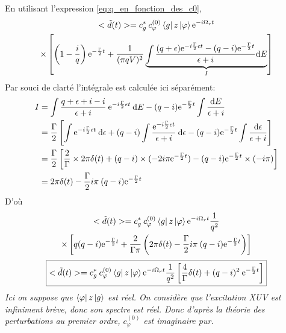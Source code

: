 En utilisant l'expression \ref{eq:q_en_fonction_des_c0},
\begin{multline}
<\tilde{d}(t)> = c_g^{*} \: c_{\varphi}^{(0)} \bra{g}  z \ket{\varphi} \mathrm{e}^{-i \Omega_r t} \\ \times \left[ \left( 1-\frac{i}{q} \right) \mathrm{e}^{-\frac{\Gamma}{2} t} + \frac{1}{(\pi q V)^2} \underbrace{\int \frac{(q+\epsilon ) \mathrm{e}^{- i \frac{\Gamma}{2} \epsilon t } - (q - i) \mathrm{e}^{-\frac{\Gamma}{2}t}}{\epsilon + i} \mathrm{d} E}_{I} \right]
\end{multline}
Par souci de clarté l'intégrale est calculée ici séparément:
\begin{align}
I & = \int \frac{q + \epsilon + i - i }{\epsilon + i} \: \mathrm{e}^{- i \frac{\Gamma}{2} \epsilon t} \: \mathrm{d} E - (q-i) \mathrm{e}^{-\frac{\Gamma}{2}t} \int \frac{\mathrm{d} E}{\epsilon + i} \\
& = \frac{\Gamma}{2} \left[ \int \mathrm{e}^{- i \frac{\Gamma}{2} \epsilon t} \: \mathrm{d} \epsilon + (q-i) \int \frac{\mathrm{e}^{- i \frac{\Gamma}{2} \epsilon t}}{\epsilon + i} \: \mathrm{d} \epsilon - (q-i) \mathrm{e}^{-\frac{\Gamma}{2}t} \int \frac{\mathrm{d} \epsilon}{\epsilon + i} \right]\\
& = \frac{\Gamma}{2} \left[ \frac{2}{\Gamma} \times 2 \pi \delta(t) + (q-i) \times (-2 i \pi \mathrm{e}^{-\frac{\Gamma}{2} t}) - (q-i) \mathrm{e}^{-\frac{\Gamma}{2} t} \times (-i \pi) \right] \\
& = 2 \pi \delta(t) - \frac{\Gamma}{2} i \pi \: (q-i) \mathrm{e}^{-\frac{\Gamma}{2} t} 
\end{align}
D'où 
\begin{multline}
<\tilde{d}(t)> = c_g^{*} \: c_{\varphi}^{(0)} \bra{g}  z \ket{\varphi} \mathrm{e}^{-i \Omega_r t} \frac{1}{q^2} \\ \times \left[ q(q-i) \mathrm{e}^{-\frac{\Gamma}{2} t} + \frac{2}{\Gamma \pi} \left( 2 \pi \delta(t) - \frac{\Gamma}{2} i \pi \: (q-i) \mathrm{e}^{-\frac{\Gamma}{2} t} \right) \right]
\end{multline}
\begin{equation}
\setlength\fboxrule{0.25pt}
\boxed{
<\tilde{d}(t)> = c_g^{*} \: c_{\varphi}^{(0)} \bra{g}  z \ket{\varphi} \rme^{-i \Omega_r t} \frac{1}{q^2} \left[ \frac{4}{\Gamma} \delta(t) + (q-i)^2 \: \rme^{-\frac{\Gamma}{2} t} \right]
}
\end{equation}
\textit{Ici on suppose que $\bra{ \varphi}  z \ket{g}$ est réel. On considère que l'excitation XUV est infiniment brève, donc son spectre est réel. Donc d'après la théorie des perturbations au premier ordre, $c_{\varphi}^{(0)}$ est imaginaire pur. }%
